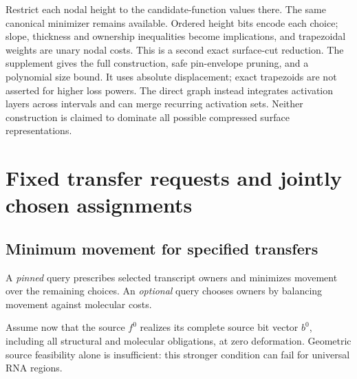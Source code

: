 \documentclass[10pt,letterpaper]{article}
\begin{document}
Restrict each nodal height to the candidate-function values there. The same canonical minimizer remains available. Ordered height bits encode each choice; slope, thickness and ownership inequalities become implications, and trapezoidal weights are unary nodal costs. This is a second exact surface-cut reduction. The supplement gives the full construction, safe pin-envelope pruning, and a polynomial size bound. It uses absolute displacement; exact trapezoids are not asserted for higher loss powers. The direct graph instead integrates activation layers across intervals and can merge recurring activation sets. Neither construction is claimed to dominate all possible compressed surface representations.

\section{Fixed transfer requests and jointly chosen assignments}\label{sec:queries}
\subsection{Minimum movement for specified transfers}
A \emph{pinned} query prescribes selected transcript owners and minimizes movement over the remaining choices. An \emph{optional} query chooses owners by balancing movement against molecular costs.

Assume now that the source $f^0$ realizes its complete source bit vector $b^0$, including all structural and molecular obligations, at zero deformation. Geometric source feasibility alone is insufficient: this stronger condition can fail for universal RNA regions.
\end{document}
